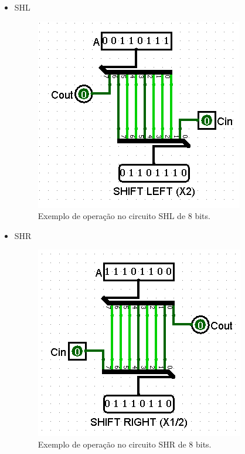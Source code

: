 \documentclass[
	12pt,				%
	openright,			%
	twoside,			%
	a4paper,			%
	english,			%
	french,				%
	spanish,			%
	brazil,				%
	]{abntex2}
\begin{document}
\begin{apendicesenv}
\begin{itemize}
\item {SHL}

\begin{figure}[H]
	\begin{center}
	    \includegraphics[scale=0.6]{imagens/SHLteste.png}
	\end{center}
\caption{\label{shlteste}Exemplo de operação no circuito SHL de 8 bits.}
\end{figure}

\item {SHR}

\begin{figure}[H]
	\begin{center}
	    \includegraphics[scale=0.6]{imagens/SHRteste.png}
	\end{center}
\caption{\label{shrteste}Exemplo de operação no circuito SHR de 8 bits.}
\end{figure}

\end{itemize}


\end{apendicesenv}
\end{document}
